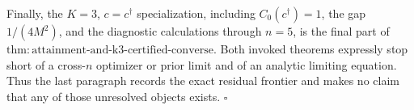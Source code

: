 Finally, the \(K=3\), \(c=c^\dagger\) specialization, including \(C_0(c^\dagger)=1\), the gap \(1/(4M^2)\), and the diagnostic calculations through \(n=5\), is the final part of \(\mathrm{thm:attainment\text{-}and\text{-}k3\text{-}certified\text{-}converse}\). Both invoked theorems expressly stop short of a cross-\(n\) optimizer or prior limit and of an analytic limiting equation. Thus the last paragraph records the exact residual frontier and makes no claim that any of those unresolved objects exists. \(\square\)